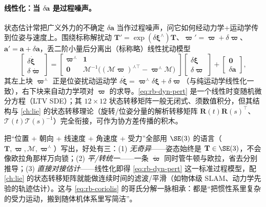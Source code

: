 \paragraph{线性化：当 $\delta\mathbf{a}$ 是过程噪声。}状态估计常把广义外力的不确定 $\delta\mathbf{a}$ 当作过程噪声，问它如何经动力学+运动学传到位姿与速度上。围绕标称解扰动 $\mathbf{T}'=\exp(\delta\boldsymbol{\xi}^\wedge)\mathbf{T}$、$\boldsymbol{\varpi}'=\boldsymbol{\varpi}+\delta\boldsymbol{\varpi}$、$\mathbf{a}'=\mathbf{a}+\delta\mathbf{a}$，丢二阶小量后分离出（标称略）线性扰动模型
\begin{equation}
  \begin{bmatrix}\delta\dot{\boldsymbol{\xi}}\\\delta\dot{\boldsymbol{\varpi}}\end{bmatrix}
  =\begin{bmatrix}\boldsymbol{\varpi}^\curlywedge & \mathbf{1}\\ \mathbf{0} & \boldsymbol{\mathcal{M}}^{-1}\big((\boldsymbol{\mathcal{M}}\boldsymbol{\varpi})^{\curlywedge\top}-\boldsymbol{\varpi}^\curlywedge\boldsymbol{\mathcal{M}}\big)\end{bmatrix}
  \begin{bmatrix}\delta\boldsymbol{\xi}\\\delta\boldsymbol{\varpi}\end{bmatrix}
  +\begin{bmatrix}\mathbf{0}\\\delta\mathbf{a}\end{bmatrix},
  \label{eq:rb-dyn-pert}
\end{equation}
其左上块 $\boldsymbol{\varpi}^\curlywedge$ 正是位姿扰动运动学 $\delta\dot{\boldsymbol{\xi}}=\boldsymbol{\varpi}^\curlywedge\delta\boldsymbol{\xi}+\delta\boldsymbol{\varpi}$（与纯运动学线性化一致），右下块来自动力学项对 $\boldsymbol{\varpi}$ 的求导\cite{barfoot2024state}。\cref{eq:rb-dyn-pert} 是一个线性时变随机微分方程（LTV SDE）；其 $12\times12$ 状态转移矩阵一般无闭式、须数值积分，但其结构与 \cref{ch:lie} 的状态转移理论（旋转/位姿分量的解析转移矩阵 $\mathbf{R}(t)\mathbf{R}(s)^\top$、$\boldsymbol{\mathcal{T}}(t)\boldsymbol{\mathcal{T}}(s)^{-1}$）完全衔接，可作为协方差传播的积木。

\begin{insight}[为何把动力学也塞进 $\SE(3)$]
把“位置 + 朝向 + 线速度 + 角速度 + 受力”全部用 $\SE(3)$ 的语言（$\mathbf{T},\boldsymbol{\varpi},\boldsymbol{\mathcal{M}},\boldsymbol{\varpi}^\curlywedge$）写出，好处有三：(1) \emph{无奇异}——姿态始终是 $\mathbf{T}\in\SE(3)$，不会像欧拉角那样万向锁；(2) \emph{平/转统一}——一条 $\dot{\boldsymbol{\varpi}}$ 同时管牛顿与欧拉，省去分别推导；(3) \emph{直接对接估计}——线性化即得 \cref{eq:rb-dyn-pert} 这一标准过程模型，配 \cref{ch:lie} 的状态转移矩阵就能做连续时间的滤波/平滑（如物体级 SLAM、动力学先验的轨迹估计）。这与 \cref{eq:rb-coriolis} 的哥氏分解一脉相承：都是“把惯性系里复杂的受力运动，搬到随体机体系里写简洁”。
\end{insight}

